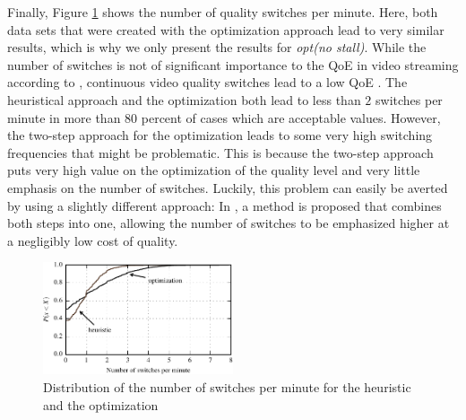 Finally, Figure \ref{fig:switches} shows the number of quality switches per minute. Here, both data sets that were created with the optimization approach lead to very similar results, which is why we only present the results for \textit{opt(no stall)}. While the number of switches is not of significant importance to the QoE in video streaming according to \cite{seufert2015survey}, continuous video quality switches lead to a low QoE \cite{liu2013user}. The heuristical approach and the optimization both lead to less than $2$ switches per minute in more than $80$ percent of cases which are acceptable values. However, the two-step approach for the optimization leads to some very high switching frequencies that might be problematic. This is because the two-step approach puts very high value on the optimization of the quality level and very little emphasis on the number of switches. Luckily, this problem can easily be averted by using a slightly different approach: In \cite{liotou2016enriching}, a method is proposed that combines both steps into one, allowing the number of switches to be emphasized higher at a negligibly low cost of quality.

\begin{figure}[t]
\centering
\includegraphics[width=0.5\textwidth]{figs/switches_py}%
\caption{Distribution of the number of switches per minute for the heuristic and the optimization}
\label{fig:switches}%
\end{figure}

